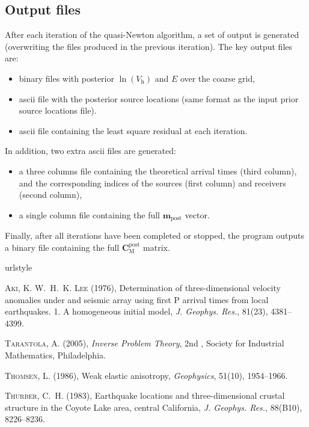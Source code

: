 \documentclass{article}
\renewcommand\vec[1]{\mathbf{#1}}
\newcommand\mat[1]{\mathbf{#1}}
\begin{document}
\subsection{Output files}

After each iteration of the quasi-Newton algorithm, a set of output is generated (overwriting the files produced in the previous iteration). The key output files are:
\begin{itemize} 
\item binary files with posterior $\ln(V_\mathrm{h})$ and $E$ over the coarse grid,
\item ascii file with the posterior source locations (same format as the input prior source locations file).
\item ascii file containing the least square residual at each iteration.
\end{itemize}

In addition, two extra ascii files are generated:
\begin{itemize}
\item a three columns file containing the theoretical arrival times (third column), and the corresponding indices of the sources (first column) and receivers (second column),
\item a single column file containing the full $\vec{m}_\mathrm{post}$ vector.
\end{itemize}

Finally, after all iterations have been completed or stopped, the program outputs a binary file containing the full $\mat{C}_\mathrm{M}^\mathrm{post}$ matrix.

\begin{thebibliography}{4}
\providecommand{\natexlab}[1]{#1}
\expandafter\ifx\csname urlstyle\endcsname\relax
  \providecommand{\doi}[1]{doi:\discretionary{}{}{}#1}\else
  \providecommand{\doi}{doi:\discretionary{}{}{}\begingroup
  \urlstyle{rm}\Url}\fi

\newcommand{\Capitalize}[1]{\uppercase{#1}}
\newcommand{\capitalize}[1]{\expandafter\Capitalize#1}

\textsc{Aki, K.} \bbland{} \textsc{W.~H.~K. Lee} (1976), Determination of
  thres-dimensional velocity anomalies under and seismic array using first {P}
  arrival times from local earthquakes. 1. {A} homogeneous initial model,
  \emph{J. Geophys. Res.}, 81(23), 4381--4399.

\textsc{Tarantola, A.} (2005), \emph{Inverse Problem Theory}, 2nd
  \bbledition{}, Society for Industrial Mathematics, Philadelphia.

\textsc{Thomsen, L.} (1986), Weak elastic anisotropy, \emph{Geophysics},
  51(10), 1954--1966.

\textsc{Thurber, C.~H.} (1983), Earthquake locations and three-dimensional
  crustal structure in the {C}oyote {L}ake area, central {C}alifornia, \emph{J.
  Geophys. Res.}, 88(B10), 8226--8236.

\end{thebibliography}
\end{document}
